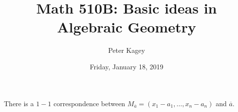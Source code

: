 \documentclass{article}
\newenvironment{note}[1][Note.]{
  \begin{trivlist} \item[\hskip \labelsep {\bfseries #1}]
}{\end{trivlist}}
\begin{document}
\title{Math 510B: Basic ideas in Algebraic Geometry}
\author{Peter Kagey}
\date{Friday, January 18, 2019}

\maketitle

\begin{note}
  There is a $1-1$ correspondence between
  $M_{\overline a} = (x_1 - a_1, \hdots, x_n - a_n)$ and $\overline a$.
\end{note}
\end{document}
